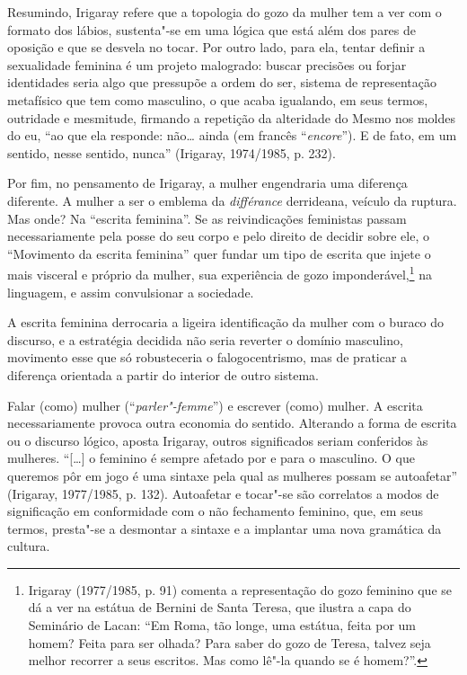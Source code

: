 Resumindo, Irigaray refere que a topologia do gozo da mulher tem a ver
com o formato dos lábios, sustenta"-se em uma lógica que está além dos
pares de oposição e que se desvela no tocar. Por outro lado, para ela,
tentar definir a sexualidade feminina é um projeto malogrado: buscar
precisões ou forjar identidades seria algo que pressupõe a ordem do ser,
sistema de representação metafísico que tem como masculino, o que acaba
igualando, em seus termos, outridade e mesmitude, firmando a repetição
da alteridade do Mesmo nos moldes do eu, ``ao que ela responde: não\ldots{}
ainda (em francês ``\emph{encore}''). E de fato, em um sentido, nesse
sentido, nunca'' (Irigaray, 1974/1985, p. 232).

Por fim, no pensamento de Irigaray, a mulher engendraria uma diferença
diferente. A mulher a ser o emblema da \emph{différance} derrideana,
veículo da ruptura. Mas onde? Na ``escrita feminina''. Se as
reivindicações feministas passam necessariamente pela posse do seu corpo
e pelo direito de decidir sobre ele, o ``Movimento da escrita feminina''
quer fundar um tipo de escrita que injete o mais visceral e próprio da
mulher, sua experiência de gozo imponderável,\footnote{Irigaray
  (1977/1985, p. 91) comenta a representação do gozo feminino que se dá
  a ver na estátua de Bernini de Santa Teresa, que ilustra a capa do
  Seminário  de Lacan: ``Em Roma, tão longe, uma estátua, feita por um
  homem? Feita para ser olhada? Para saber do gozo de Teresa, talvez
  seja melhor recorrer a seus escritos. Mas como lê"-la quando se é
  homem?''.} na linguagem, e assim convulsionar a sociedade.

A escrita feminina derrocaria a ligeira identificação da mulher com o
buraco do discurso, e a estratégia decidida não seria reverter o domínio
masculino, movimento esse que só robusteceria o falogocentrismo, mas de
praticar a diferença orientada a partir do interior de outro sistema.

Falar (como) mulher (``\emph{parler"-femme}'') e escrever (como) mulher.
A escrita necessariamente provoca outra economia do sentido. Alterando a
forma de escrita ou o discurso lógico, aposta Irigaray, outros
significados seriam conferidos às mulheres. ``{[}\ldots{}{]} o feminino é
sempre afetado por e para o masculino. O que queremos pôr em jogo é uma
sintaxe pela qual as mulheres possam se autoafetar'' (Irigaray,
1977/1985, p. 132). Autoafetar e tocar"-se são correlatos a modos de
significação em conformidade com o não fechamento feminino, que, em seus
termos, presta"-se a desmontar a sintaxe e a implantar uma nova gramática
da cultura.

